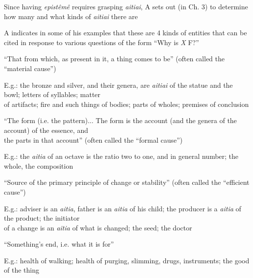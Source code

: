 \documentclass[11pt]{article}
\begin{document}
\noindent Since having \emph{epist\^{e}m\^{e}} requires grasping \emph{aitiai}, A sets out (in Ch. 3) to determine how many and what kinds of \emph{aitiai} there are
\vspace*{2mm}

\noindent A indicates in some of his examples that these are 4 kinds of entities that can be cited in response to various questions of the form ``Why is \emph{X} F?''
\vspace*{2mm}

\noindent [1] ``That from which, as present in it, a thing comes to be'' (often called the ``material cause'')
\vspace*{1mm}

E.g.: the bronze and silver, and their genera, are \emph{aitiai} of the statue and the bowl; letters of syllables; matter\\\hspace*{6mm}of artifacts; fire and such things of bodies; parts of wholes; premises of conclusion
\vspace*{2mm}

\noindent [2] ``The form (i.e. the pattern)... The form is the account (and the genera of the account) of the essence, and\\\hspace*{6mm}the parts in that account'' (often called the ``formal cause'')
\vspace*{1mm}

E.g.: the \emph{aitia} of an octave is the ratio two to one, and in general number; the whole, the composition
\vspace*{2mm}

\noindent [3] ``Source of the primary principle of change or stability'' (often called the ``efficient cause'')
\vspace*{1mm}

E.g.: adviser is an \emph{aitia}, father is an \emph{aitia} of his child; the producer is a \emph{aitia} of the product; the initiator\\\hspace*{6mm}of a change is an \emph{aitia} of what is changed; the seed; the doctor
\vspace*{2mm}

\noindent [4] ``Something's end, i.e. what it is for''
\vspace*{1mm}

E.g.: health of walking; health of purging, slimming, drugs, instruments; the good of the thing
\vspace*{2mm}
\end{document}
